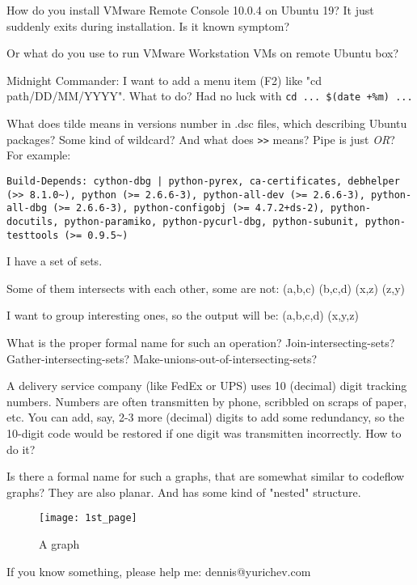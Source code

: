 How do you install VMware Remote Console 10.0.4 on Ubuntu 19? It just suddenly exits during installation.
Is it known symptom?

Or what do you use to run VMware Workstation VMs on remote Ubuntu box?

\myhrule{}

Midnight Commander: I want to add a menu item (F2) like "cd path/DD/MM/YYYY".
What to do?
Had no luck with \verb|cd ... $(date +%m) ...|

\myhrule{}

What does tilde means in versions number in .dsc files, which describing Ubuntu packages?
Some kind of wildcard?
And what does \verb|>>| means?
Pipe is just \emph{OR}?
For example:

\begin{lstlisting}
Build-Depends: cython-dbg | python-pyrex, ca-certificates, debhelper (>> 8.1.0~), python (>= 2.6.6-3), python-all-dev (>= 2.6.6-3), python-all-dbg (>= 2.6.6-3), python-configobj (>= 4.7.2+ds-2), python-docutils, python-paramiko, python-pycurl-dbg, python-subunit, python-testtools (>= 0.9.5~)
\end{lstlisting}

\myhrule{}

I have a set of sets.

Some of them intersects with each other, some are not: (a,b,c) (b,c,d) (x,z) (z,y)

I want to group interesting ones, so the output will be: (a,b,c,d) (x,y,z)

What is the proper formal name for such an operation?
Join-intersecting-sets?
Gather-intersecting-sets?
Make-unions-out-of-intersecting-sets?

\myhrule{}

A delivery service company (like FedEx or UPS) uses 10 (decimal) digit tracking numbers.
Numbers are often transmitten by phone, scribbled on scraps of paper, etc.
You can add, say, 2-3 more (decimal) digits to add some redundancy, so the 10-digit code would be restored
if one digit was transmitten incorrectly.
How to do it?

\myhrule{}

Is there a formal name for such a graphs, that are somewhat similar to codeflow graphs?
They are also planar.
And has some kind of "nested" structure.

\begin{figure}[H]
\centering
\texttt{[image: 1st\_page]}
\caption{A graph}
\end{figure}

\myhrule{}

If you know something, please help me: dennis@yurichev.com

